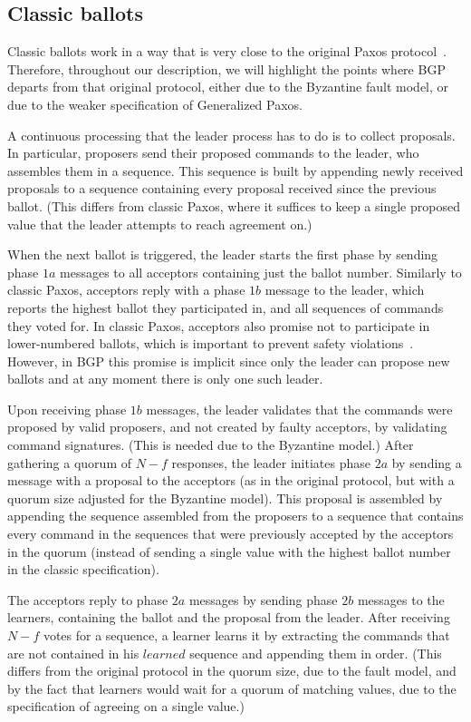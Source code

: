 \subsection{Classic ballots} 

Classic ballots work in a way that is very close to the original Paxos protocol~\cite{Lam98}. Therefore, throughout our description, we will highlight the points where BGP departs from that original protocol, either due to the Byzantine fault model, or due to the weaker specification of Generalized Paxos.

A continuous processing that the leader process has to do is to collect proposals. In particular, proposers send their proposed commands to the leader, who assembles them in a sequence. This sequence is built by appending newly received proposals to a sequence containing every proposal received since the previous ballot. (This differs from classic Paxos, where it suffices to keep a single proposed value that the leader attempts to reach agreement on.)

When the next ballot is triggered, the leader starts the first phase by sending phase $1a$ messages to all acceptors containing just the ballot number. Similarly to classic Paxos, acceptors reply with a phase $1b$ message to the leader, which reports the highest ballot they participated in, and all sequences of commands they voted for. In classic Paxos, acceptors also promise not to participate in lower-numbered ballots, which is important to prevent safety violations~\cite{Lam98}. However, in BGP this promise is implicit since only the leader can propose new ballots and at any moment there is only one such leader.

Upon receiving phase $1b$ messages, the leader validates that the commands were proposed by valid proposers, and not created by faulty acceptors, by validating command signatures. (This is needed due to the Byzantine model.)  After gathering a quorum of $N-f$ responses, the leader initiates phase $2a$ by sending a message with a proposal to the acceptors (as in the original protocol, but with a quorum size adjusted for the Byzantine model). This proposal is assembled by appending the sequence assembled from the proposers to a sequence that contains every command in the sequences that were previously accepted by the acceptors in the quorum (instead of sending a single value with the highest ballot number in the classic specification).

The acceptors reply to phase $2a$ messages by sending phase $2b$ messages to the learners, containing the ballot and the proposal from the leader. After receiving $N-f$ votes for a sequence, a learner learns it by extracting the commands that are not contained in his $learned$ sequence and appending them in order. (This differs from the original protocol in the quorum size, due to the fault model, and by the fact that learners would wait for a quorum of matching values, due to the specification of agreeing on a single value.)

